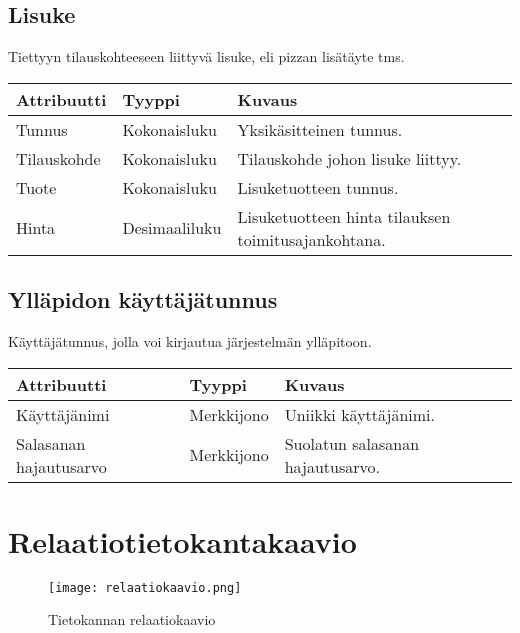 \documentclass[a4paper, 12pt, finnish]{article}
\begin{document}
\subsection*{Lisuke}
Tiettyyn tilauskohteeseen liittyvä lisuke, eli pizzan lisätäyte tms.

\vspace{0.5cm}\hspace{-1cm}
\begin{tabular}{l l p{7cm}}
\textbf{Attribuutti} & \textbf{Tyyppi} & \textbf{Kuvaus} \\
\hline
Tunnus & Kokonaisluku & Yksikäsitteinen tunnus. \\
Tilauskohde & Kokonaisluku & Tilauskohde johon lisuke liittyy. \\
Tuote & Kokonaisluku & Lisuketuotteen tunnus. \\
Hinta & Desimaaliluku & Lisuketuotteen hinta tilauksen toimitusajankohtana. \\
\end{tabular}

\subsection*{Ylläpidon käyttäjätunnus}
Käyttäjätunnus, jolla voi kirjautua järjestelmän ylläpitoon.

\vspace{0.5cm}\hspace{-1cm}
\begin{tabular}{l l p{7cm}}
\textbf{Attribuutti} & \textbf{Tyyppi} & \textbf{Kuvaus} \\
\hline
Käyttäjänimi & Merkkijono & Uniikki käyttäjänimi. \\
Salasanan hajautusarvo & Merkkijono & Suolatun salasanan hajautusarvo. \\
\end{tabular}

\section{Relaatiotietokantakaavio}

\begin{figure}[H]
	\begin{center}
	\caption{Tietokannan relaatiokaavio}
	\texttt{[image: relaatiokaavio.png]}
	\end{center}
\end{figure}
\end{document}
